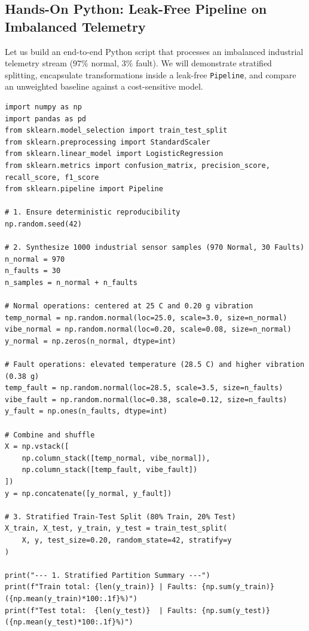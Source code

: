 \subsection{Hands-On Python: Leak-Free Pipeline on Imbalanced Telemetry}\label{subsec:splitting_python}

Let us build an end-to-end Python script that processes an imbalanced industrial telemetry stream ($97\%$ normal, $3\%$ fault). We will demonstrate stratified splitting, encapsulate transformations inside a leak-free \texttt{Pipeline}, and compare an unweighted baseline against a cost-sensitive model.

\begin{lstlisting}[style=pythonstyle]
import numpy as np
import pandas as pd
from sklearn.model_selection import train_test_split
from sklearn.preprocessing import StandardScaler
from sklearn.linear_model import LogisticRegression
from sklearn.metrics import confusion_matrix, precision_score, recall_score, f1_score
from sklearn.pipeline import Pipeline

# 1. Ensure deterministic reproducibility
np.random.seed(42)

# 2. Synthesize 1000 industrial sensor samples (970 Normal, 30 Faults)
n_normal = 970
n_faults = 30
n_samples = n_normal + n_faults

# Normal operations: centered at 25 C and 0.20 g vibration
temp_normal = np.random.normal(loc=25.0, scale=3.0, size=n_normal)
vibe_normal = np.random.normal(loc=0.20, scale=0.08, size=n_normal)
y_normal = np.zeros(n_normal, dtype=int)

# Fault operations: elevated temperature (28.5 C) and higher vibration (0.38 g)
temp_fault = np.random.normal(loc=28.5, scale=3.5, size=n_faults)
vibe_fault = np.random.normal(loc=0.38, scale=0.12, size=n_faults)
y_fault = np.ones(n_faults, dtype=int)

# Combine and shuffle
X = np.vstack([
    np.column_stack([temp_normal, vibe_normal]),
    np.column_stack([temp_fault, vibe_fault])
])
y = np.concatenate([y_normal, y_fault])

# 3. Stratified Train-Test Split (80% Train, 20% Test)
X_train, X_test, y_train, y_test = train_test_split(
    X, y, test_size=0.20, random_state=42, stratify=y
)

print("--- 1. Stratified Partition Summary ---")
print(f"Train total: {len(y_train)} | Faults: {np.sum(y_train)} ({np.mean(y_train)*100:.1f}%)")
print(f"Test total:  {len(y_test)}  | Faults: {np.sum(y_test)}  ({np.mean(y_test)*100:.1f}%)")


\end{lstlisting}
